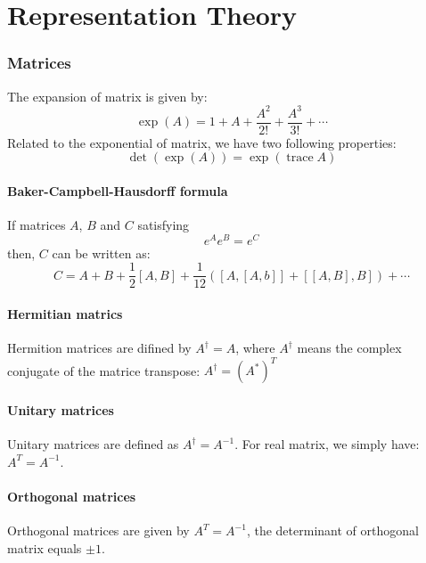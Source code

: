 \documentclass{amsart}
\theoremstyle{remark}
\theoremstyle{remark}
\theoremstyle{definition}
\DeclareMathOperator{\Tr}{trace}
\begin{document}
\newpage
\part{Representation Theory}

\section*{Matrices}
The expansion of matrix is given by:
\begin{equation*}
    \exp(A) = 1+ A + \frac{A^2}{2!} + \frac{A^3}{3!} + \cdots 
\end{equation*}
Related to the exponential of matrix, we have two following properties:
\begin{equation*}
    \det(\exp(A)) = \exp(\Tr A)
\end{equation*}

\subsection*{Baker-Campbell-Hausdorff formula}
If matrices $A$, $B$ and $C$ satisfying
\begin{equation*}
    e^{A} e^{B} = e^{C}
\end{equation*}
then, $C$ can be written as:
\begin{equation*}
    C = A + B + \frac{1}{2}[A,B] + \frac{1}{12}\left( [A,[A,b]] + [[A,B],B] \right) + \cdots
\end{equation*}

\vspace{10pt}

\subsection*{Hermitian matrics}
Hermition matrices are difined by $A^{\dagger} = A$, where $A^{\dagger}$ means
the complex conjugate of the matrice transpose: $A^{\dagger} = (A^*)^{T}$

\subsection*{Unitary matrices}
Unitary matrices are defined as $A^{\dagger} = A^{-1}$. 
For real matrix, we simply have: $A^T = A^{-1}$.

\subsection*{Orthogonal matrices}
Orthogonal matrices are given by $A^T = A^{-1}$, the determinant of orthogonal
matrix equals $\pm 1$. 
\end{document}
